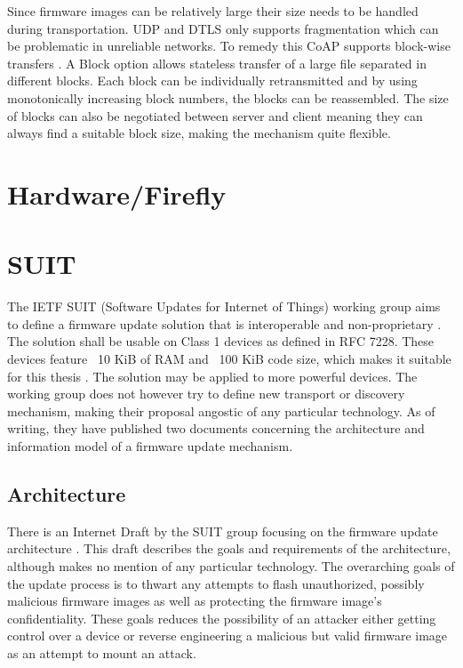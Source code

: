 \documentclass[0-thesis.tex]{subfiles}
\begin{document}
Since firmware images can be relatively large their size needs to be handled during
transportation. UDP and DTLS only supports fragmentation which can be problematic in
unreliable networks. To remedy this CoAP supports block-wise transfers
\parencite{rfc7959}. A Block option allows stateless transfer of a large file separated in
different blocks. Each block can be individually retransmitted and by using monotonically
increasing block numbers, the blocks can be reassembled. The size of blocks can also be
negotiated between server and client meaning they can always find a suitable block size,
making the mechanism quite flexible.

\section{Hardware/Firefly}
\label{sec:hardware}

\section{SUIT}
\label{sec:suit}
The IETF SUIT (Software Updates for Internet of Things) working group aims to define a
firmware update solution that is interoperable and non-proprietary \parencite{suit}. The
solution shall be usable on Class 1 devices as defined in RFC 7228. These devices feature
~10 KiB of RAM and ~100 KiB code size, which makes it suitable for this thesis
\parencite{rfc7228}. The solution may be applied to more powerful devices. The working
group does not however try to define new transport or discovery mechanism, making their
proposal angostic of any particular technology. As of writing, they have published two
documents concerning the architecture and information model of a firmware update
mechanism.

\subsection{Architecture}
\label{ssec:architecture}
There is an Internet Draft by the SUIT group focusing on the firmware update architecture
\parencite{suit-architecture}. This draft describes the goals and requirements of the
architecture, although makes no mention of any particular technology. The overarching
goals of the update process is to thwart any attempts to flash unauthorized, possibly
malicious firmware images as well as protecting the firmware image's confidentiality.
These goals reduces the possibility of an attacker either getting control over a device or
reverse engineering a malicious but valid firmware image as an attempt to mount an attack.
\end{document}
